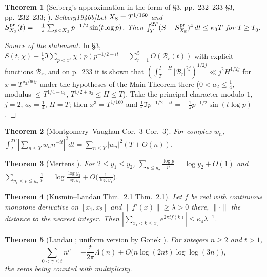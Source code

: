 \documentclass[11pt,reqno]{amsart}
\makeatletter
\let\CG@origcite\cite
\renewcommand*{\cite}[2][]{\def\CG@citekey{#2}%
  \ifx\relax#1\relax\CG@origcite{#2}\else\CG@origcite[#1]{#2}\fi}
\numberwithin{equation}{section}
\theoremstyle{plain}
\newtheorem{theorem}{Theorem}[section]
\theoremstyle{definition}
\theoremstyle{remark}
\makeatother
\begin{document}
\begin{theorem}[Selberg's approximation in the form of {\cite[\S3, pp.~232--233]{Fujii1974}}; \cite{Selberg1946b}]\label{thm:known_selberg_approx}
Let $X_{\rm S}=T^{1/160}$ and $S^{\rm pr}_{X_{\rm S}}(t)=-\frac1\pi\sum_{p<X_{\rm S}}p^{-1/2}\sin(t\log p)$. Then $\int_T^{2T}(S-S^{\rm pr}_{X_{\rm S}})^4\,dt\le\kappa_3T$ for $T\ge T_0$.
\end{theorem}

\begin{proof}[Source of the statement]
In \cite[\S3]{Fujii1974}, $S(t,\chi)-\frac1\pi\Im\sum_{p<x^3}\chi(p)p^{-1/2-it}=\sum_{r=1}^5O(\mathcal B_r(t))$ with explicit functions $\mathcal B_r$, and on p.~233 it is shown that $(\int_T^{T+H}|\mathcal B_r|^{2j})^{1/2j}\ll j^2H^{1/2j}$ for $x=T^{a_2/60j}$ under the hypotheses of the Main Theorem there ($0<a_2\le\frac14$, modulus $\le T^{1/4-a_1}$, $T^{1/2+a_2}\le H\le T$). Take the principal character modulo $1$, $j=2$, $a_2=\frac14$, $H=T$; then $x^3=T^{1/160}$ and $\frac1\pi\Im p^{-1/2-it}=-\frac1\pi p^{-1/2}\sin(t\log p)$.
\end{proof}

\begin{theorem}[Montgomery--Vaughan {\cite[Cor.~3]{MontgomeryVaughan1974}}]\label{thm:known_MV}
For complex $w_n$, $\int_T^{2T}|\sum_{n\le Y}w_nn^{-it}|^2dt=\sum_{n\le Y}|w_n|^2(T+O(n))$.
\end{theorem}

\begin{theorem}[Mertens {\cite{Mertens1874}}]\label{thm:known_mertens}
For $2\le y_1\le y_2$, $\sum_{p\le y_2}\frac{\log p}p=\log y_2+O(1)$ and $\sum_{y_1<p\le y_2}\frac1p=\log\frac{\log y_2}{\log y_1}+O\bigl(\frac1{\log y_1}\bigr)$.
\end{theorem}

\begin{theorem}[Kusmin--Landau {\cite[Thm.~2.1]{GrahamKolesnik1991}}]\label{thm:known_KL}
Let $f$ be real with continuous monotone derivative on $[x_1,x_2]$ and $\|f'(x)\|\ge\lambda>0$ there, $\|\cdot\|$ the distance to the nearest integer. Then $|\sum_{x_1<k\le x_2}e^{2\pi if(k)}|\le\kappa_4\lambda^{-1}$.
\end{theorem}

\begin{theorem}[Landau {\cite{Landau1912}}; uniform version by Gonek {\cite{Gonek1993}}]\label{thm:known_landau}
For integers $n\ge2$ and $t>1$,
\begin{equation}
\sum_{0<\gamma\le t}n^{\rho}=-\frac t{2\pi}\Lambda(n)+O\bigl(n\log(2nt)\log\log(3n)\bigr),
\label{eq:landau_gonek}
\end{equation}
the zeros being counted with multiplicity.
\end{theorem}
\end{document}
